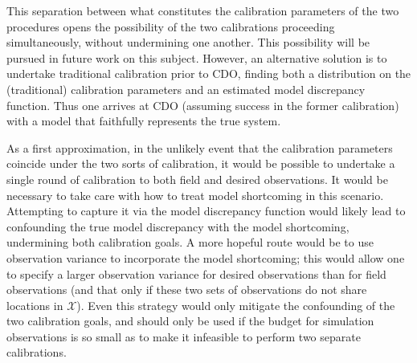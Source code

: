 \documentclass{article}
\begin{document}
This separation between what constitutes the calibration parameters of the two procedures opens the possibility of the two calibrations proceeding simultaneously, without undermining one another. This possibility will be pursued in future work on this subject. However, an alternative solution is to undertake traditional calibration prior to CDO, finding both a distribution on the (traditional) calibration parameters and an estimated model discrepancy function. Thus one arrives at CDO (assuming success in the former calibration) with a model that faithfully represents the true system.

As a first approximation, in the unlikely event that the calibration parameters coincide under the two sorts of calibration, it would be possible to undertake a single round of calibration to both field and desired observations. It would be necessary to take care with how to treat model shortcoming in this scenario. Attempting to capture it via the model discrepancy function would likely lead to confounding the true model discrepancy with the model shortcoming, undermining both calibration goals. A more hopeful route would be to use observation variance to incorporate the model shortcoming; this would allow one to specify a larger observation variance for desired observations than for field observations (and that only if these two sets of observations do not share locations in $\mathcal X$). Even this strategy would only mitigate the confounding of the two calibration goals, and should only be used if the budget for simulation observations is so small as to make it infeasible to perform two separate calibrations.
\end{document}

